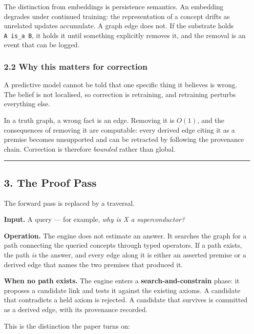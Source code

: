 \documentclass[
  11pt,
  a4paper,
]{article}
\begin{document}
The distinction from embeddings is persistence semantics. An embedding
degrades under continued training: the representation of a concept
drifts as unrelated updates accumulate. A graph edge does not. If the
substrate holds \texttt{A\ is\_a\ B}, it holds it until something
explicitly removes it, and the removal is an event that can be logged.

\subsubsection{2.2 Why this matters for
correction}\label{why-this-matters-for-correction}

A predictive model cannot be told that one specific thing it believes is
wrong. The belief is not localised, so correction is retraining, and
retraining perturbs everything else.

In a truth graph, a wrong fact is an edge. Removing it is \(O(1)\), and
the consequences of removing it are computable: every derived edge
citing it as a premise becomes unsupported and can be retracted by
following the provenance chain. Correction is therefore \emph{bounded}
rather than global.

\begin{center}\rule{0.5\linewidth}{0.5pt}\end{center}

\subsection{3. The Proof Pass}\label{the-proof-pass}

The forward pass is replaced by a traversal.

\textbf{Input.} A query --- for example, \emph{why is X a
superconductor?}

\textbf{Operation.} The engine does not estimate an answer. It searches
the graph for a path connecting the queried concepts through typed
operators. If a path exists, the path \emph{is} the answer, and every
edge along it is either an asserted premise or a derived edge that names
the two premises that produced it.

\textbf{When no path exists.} The engine enters a
\textbf{search-and-constrain} phase: it proposes a candidate link and
tests it against the existing axioms. A candidate that contradicts a
held axiom is rejected. A candidate that survives is committed as a
derived edge, with its provenance recorded.

This is the distinction the paper turns on:
\end{document}
